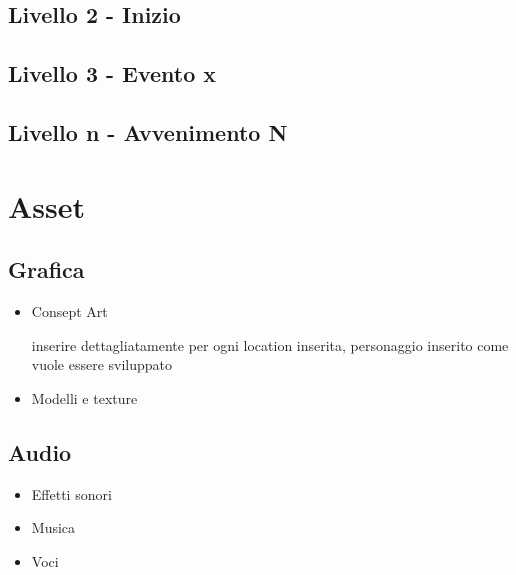 \documentclass{report}
\begin{document}
\subsection{Livello 2 - Inizio}
\subsection{Livello 3 - Evento x}
\subsection{Livello n - Avvenimento N}

\section{Asset}
\subsection{Grafica}
\begin{itemize}
    \item Consept Art

    inserire dettagliatamente per ogni location inserita, personaggio inserito come vuole essere sviluppato
    \item Modelli e texture
\end{itemize}
\subsection{Audio}
\begin{itemize}
    \item Effetti sonori
    \item Musica
    \item Voci
\end{itemize}
\end{document}
